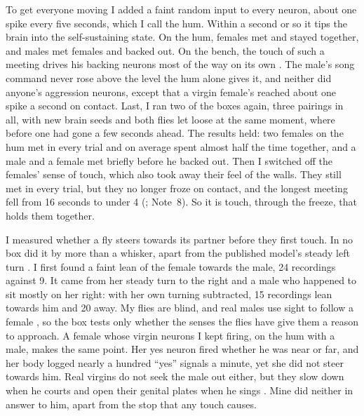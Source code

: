 To get everyone moving I added a faint random input to every neuron, about one spike every five seconds, which I call the hum. Within a second or so it tips the brain into the self-sustaining state. On the hum, females met and stayed together, and males met females and backed out. On the bench, the touch of such a meeting drives his backing neurons most of the way on its own . The male's song command never rose above the level the hum alone gives it, and neither did anyone's aggression neurons, except that a virgin female's reached about one spike a second on contact. Last, I ran two of the boxes again, three pairings in all, with new brain seeds and both flies let loose at the same moment, where before one had gone a few seconds ahead. The results held: two females on the hum met in every trial and on average spent almost half the time together, and a male and a female met briefly before he backed out. Then I switched off the females' sense of touch, which also took away their feel of the walls. They still met in every trial, but they no longer froze on contact, and the longest meeting fell from 16 seconds to under 4 (; Note~8). So it is touch, through the freeze, that holds them together.

I measured whether a fly steers towards its partner before they first touch. In no box did it by more than a whisker, apart from the published model's steady left turn . I first found a faint lean of the female towards the male, 24 recordings against 9. It came from her steady turn to the right and a male who happened to sit mostly on her right: with her own turning subtracted, 15 recordings lean towards him and 20 away. My flies are blind, and real males use sight to follow a female \citep{ribeiro2018visual}, so the box tests only whether the senses the flies have give them a reason to approach. A female whose virgin neurons I kept firing, on the hum with a male, makes the same point. Her yes neuron fired whether he was near or far, and her body logged nearly a hundred ``yes'' signals a minute, yet she did not steer towards him. Real virgins do not seek the male out either, but they slow down when he courts and open their genital plates when he sings \citep{bussell2014abdominal,wang2021neural}. Mine did neither in answer to him, apart from the stop that any touch causes.

